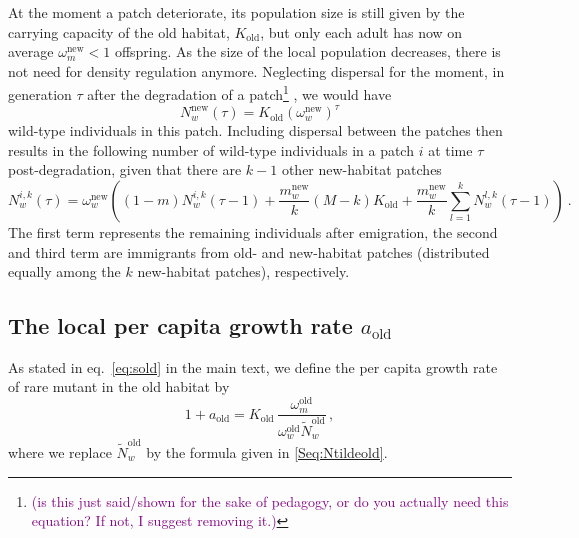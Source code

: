 \documentclass[11pt]{article}
\newcommand{\florence}[1]{\textcolor{purple}{(#1)}} %
\begin{document}
At the moment a patch deteriorate, its population size is still given by the carrying capacity of the old habitat, $K_{\text{old}}$, but only each adult has now on average $\omega_{m}^{\text{new}}<1$ offspring. As the size of the local population decreases, there is not need for density regulation anymore. Neglecting dispersal for the moment, in generation $\tau$ after the degradation of a patch\footnote{\florence{is this just said/shown for the sake of pedagogy, or do you actually need this equation? If not, I suggest removing it.}} , we would have 
	\begin{equation}
	N_w^{\text{new}}(\tau) = K_{\text{old}}(\omega_w^{\text{new}})^{\tau}
	\end{equation}
	wild-type individuals in this patch. Including dispersal between the patches then results in the following number of wild-type individuals in a patch $i$ at time $\tau$ post-degradation, given that there are $k-1$ other new-habitat patches
	\begin{equation}
	N_w^{i,k}(\tau) = \omega_w^{\text{new}}\left((1-m)N_w^{i,k}(\tau-1) + \frac{m_w^{\text{new}}}{k} (M-k) K_{\text{old}} + \frac{m_w^{\text{new}}}{k} \sum_{l=1}^k N_w^{l,k}(\tau-1) \right)\ .
	\end{equation}
	The first term represents the remaining individuals after emigration, the second and third term are immigrants from old- and new-habitat patches (distributed equally among the $k$ new-habitat patches), respectively. 

\subsection*{The local per capita growth rate $a_{\text{old}}$}
As stated in eq.~\eqref{eq:sold} in the main text, we define the per capita growth rate of rare mutant in the old habitat by
\begin{equation}
1 + a_{\text{old}} = K_{\text{old}}\, \dfrac{\omega^\text{old}_m}{\omega^\text{old}_w \widetilde{N}_w^{\text{old}}}\, ,    
\end{equation}
%
where we replace $\widetilde{N}_w^{\text{old}}$ by the formula given in \eqref{Seq:Ntildeold}. 
\end{document}
